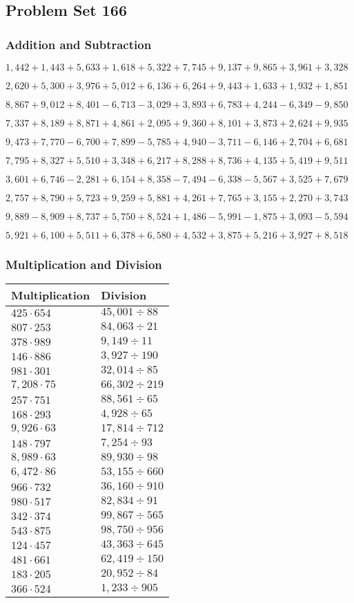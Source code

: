 \hypertarget{problem-set-166}{%
\subsection{Problem Set 166}\label{problem-set-166}}

\hypertarget{addition-and-subtraction}{%
\subsubsection{Addition and
Subtraction}\label{addition-and-subtraction}}

\(1,442+1,443+5,633+1,618+5,322+7,745+9,137+9,865+3,961+3,328\)

\(2,620+5,300+3,976+5,012+6,136+6,264+9,443+1,633+1,932+1,851\)

\(8,867+9,012+8,401-6,713-3,029+3,893+6,783+4,244-6,349-9,850\)

\(7,337+8,189+8,871+4,861+2,095+9,360+8,101+3,873+2,624+9,935\)

\(9,473+7,770-6,700+7,899-5,785+4,940-3,711-6,146+2,704+6,681\)

\(7,795+8,327+5,510+3,348+6,217+8,288+8,736+4,135+5,419+9,511\)

\(3,601+6,746-2,281+6,154+8,358-7,494-6,338-5,567+3,525+7,679\)

\(2,757+8,790+5,723+9,259+5,881+4,261+7,765+3,155+2,270+3,743\)

\(9,889-8,909+8,737+5,750+8,524+1,486-5,991-1,875+3,093-5,594\)

\(5,921+6,100+5,511+6,378+6,580+4,532+3,875+5,216+3,927+8,518\)

\hypertarget{multiplication-and-division}{%
\subsubsection{Multiplication and
Division}\label{multiplication-and-division}}

\begin{longtable}[]{@{}ll@{}}
\toprule
Multiplication & Division\tabularnewline
\midrule
\endhead
\(425\cdot654\) & \(45,001÷88\)\tabularnewline
\(807\cdot253\) & \(84,063÷21\)\tabularnewline
\(378\cdot989\) & \(9,149÷11\)\tabularnewline
\(146\cdot886\) & \(3,927÷190\)\tabularnewline
\(981\cdot301\) & \(32,014÷85\)\tabularnewline
\(7,208\cdot75\) & \(66,302÷219\)\tabularnewline
\(257\cdot751\) & \(88,561÷65\)\tabularnewline
\(168\cdot293\) & \(4,928÷65\)\tabularnewline
\(9,926\cdot63\) & \(17,814÷712\)\tabularnewline
\(148\cdot797\) & \(7,254÷93\)\tabularnewline
\(8,989\cdot63\) & \(89,930÷98\)\tabularnewline
\(6,472\cdot86\) & \(53,155÷660\)\tabularnewline
\(966\cdot732\) & \(36,160÷910\)\tabularnewline
\(980\cdot517\) & \(82,834÷91\)\tabularnewline
\(342\cdot374\) & \(99,867÷565\)\tabularnewline
\(543\cdot875\) & \(98,750÷956\)\tabularnewline
\(124\cdot457\) & \(43,363÷645\)\tabularnewline
\(481\cdot661\) & \(62,419÷150\)\tabularnewline
\(183\cdot205\) & \(20,952÷84\)\tabularnewline
\(366\cdot524\) & \(1,233÷905\)\tabularnewline
\bottomrule
\end{longtable}
